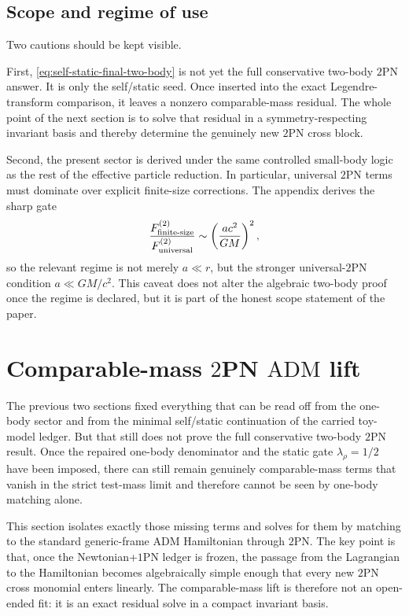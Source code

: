 \documentclass[11pt]{article}
\newcommand{\OnePN}{\mathrm{1PN}}
\newcommand{\TwoPN}{\mathrm{2PN}}
\newcommand{\ADM}{\mathrm{ADM}}
\begin{document}
\subsection{Scope and regime of use}
\label{sec:self-static-scope}

Two cautions should be kept visible.

First, \cref{eq:self-static-final-two-body} is not yet the full conservative two-body
\(\TwoPN\) answer.  It is only the self/static seed.  Once inserted into the exact
Legendre-transform comparison, it leaves a nonzero comparable-mass residual.  The whole
point of the next section is to solve that residual in a symmetry-respecting invariant
basis and thereby determine the genuinely new \(\TwoPN\) cross block.

Second, the present sector is derived under the same controlled small-body logic as the
rest of the effective particle reduction.  In particular, universal \(\TwoPN\) terms
must dominate over explicit finite-size corrections.  The appendix derives the sharp
gate
\begin{equation}
\frac{F_{\rm finite\text{-}size}^{(2)}}{F_{\rm universal}^{(2)}}
\sim \left(\frac{a c^2}{GM}\right)^2,
\label{eq:self-static-finite-size-gate}
\end{equation}
so the relevant regime is not merely \(a\ll r\), but the stronger universal-\(\TwoPN\)
condition \(a\ll GM/c^2\).  This caveat does not alter the algebraic two-body proof
once the regime is declared, but it is part of the honest scope statement of the paper.

\section{Comparable-mass \texorpdfstring{$2$}{2}PN \texorpdfstring{$\ADM$}{ADM} lift}
\label{sec:adm-lift}

The previous two sections fixed everything that can be read off from the one-body
sector and from the minimal self/static continuation of the carried toy-model
ledger.  But that still does not prove the full conservative two-body
\(\TwoPN\) result.  Once the repaired one-body denominator and the static gate
\(\lambda_\rho=1/2\) have been imposed, there can still remain genuinely
comparable-mass terms that vanish in the strict test-mass limit and therefore cannot
be seen by one-body matching alone.

This section isolates exactly those missing terms and solves for them by matching to
the standard generic-frame \(\ADM\) Hamiltonian through \(\TwoPN\).  The key point
is that, once the Newtonian+\(\OnePN\) ledger is frozen, the passage from the
Lagrangian to the Hamiltonian becomes algebraically simple enough that every new
\(\TwoPN\) cross monomial enters linearly.  The comparable-mass lift is therefore
not an open-ended fit: it is an exact residual solve in a compact invariant basis.
\end{document}
